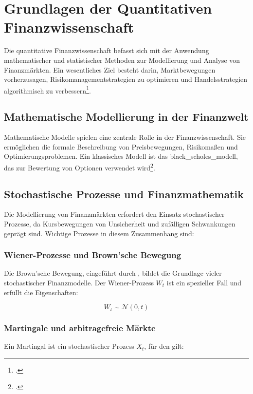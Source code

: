 \section{Grundlagen der Quantitativen Finanzwissenschaft}
\label{sec:grundlagen}

Die quantitative Finanzwissenschaft befasst sich mit der Anwendung mathematischer und statistischer Methoden zur Modellierung und Analyse von Finanzmärkten. Ein wesentliches Ziel besteht darin, Marktbewegungen vorherzusagen, Risikomanagementstrategien zu optimieren und Handelsstrategien algorithmisch zu verbessern\footcite{Shreve2004}.

\subsection{Mathematische Modellierung in der Finanzwelt}
Mathematische Modelle spielen eine zentrale Rolle in der Finanzwissenschaft. Sie ermöglichen die formale Beschreibung von Preisbewegungen, Risikomaßen und Optimierungsproblemen. Ein klassisches Modell ist das \gls{black_scholes_modell}, das zur Bewertung von Optionen verwendet wird\footcite{BlackScholes1973}.

\subsection{Stochastische Prozesse und Finanzmathematik}
Die Modellierung von Finanzmärkten erfordert den Einsatz stochastischer Prozesse, da Kursbewegungen von Unsicherheit und zufälligen Schwankungen geprägt sind. Wichtige Prozesse in diesem Zusammenhang sind:

\subsubsection{Wiener-Prozesse und Brown’sche Bewegung}
Die Brown’sche Bewegung, eingeführt durch \cite{Bachelier1900}, bildet die Grundlage vieler stochastischer Finanzmodelle. Der Wiener-Prozess \( W_t \) ist ein spezieller Fall und erfüllt die Eigenschaften:

\begin{equation}
	W_t \sim \mathcal{N}(0, t)
\end{equation}

\subsubsection{Martingale und arbitragefreie Märkte}
Ein Martingal ist ein stochastischer Prozess \( X_t \), für den gilt:

